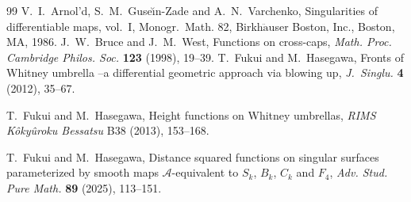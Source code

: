 \documentclass[12pt]{amsart}
\theoremstyle{plain}
\theoremstyle{definition}
\newcommand{\R}{\mathbb{R}}
\renewcommand{\geq}{\geqslant}
\begin{document}
\begin{thebibliography}{99}
{\sc V.~I.~Arnol'd, S.~M.~Guse{\u\i}n-Zade} and {\sc A.~N.~Varchenko},
Singularities of differentiable maps, vol.~I,
Monogr.\ Math. 82, Birkh$\ddot{\text{a}}$user Boston, Inc., Boston, MA, 1986.
{\sc J.~W.~Bruce} and {\sc J.~M.~West},
Functions on cross-caps,
{\it Math. Proc. Cambridge Philos. Soc.} {\bf 123} (1998), 19--39.
{\sc T.~Fukui} and {\sc M.~Hasegawa},
Fronts of Whitney umbrella --a differential geometric approach via blowing up, 
{\it J.\ Singlu.} {\bf 4} (2012), 35--67.

{\sc T.~Fukui} and {\sc M.~Hasegawa},
Height functions on Whitney umbrellas,
{\it RIMS K\^oky\^uroku Bessatsu} B38 (2013), 153--168.

{\sc T.~Fukui} and {\sc M.~Hasegawa}, 
Distance squared functions on singular surfaces parameterized by smooth maps $\mathcal{A}$-equivalent to $S_k$, $B_k$, $C_k$ and $F_4$, %
\textit{Adv. Stud. Pure Math.} \textbf{89} (2025), 113--151. 
 

\end{thebibliography}
\end{document}
